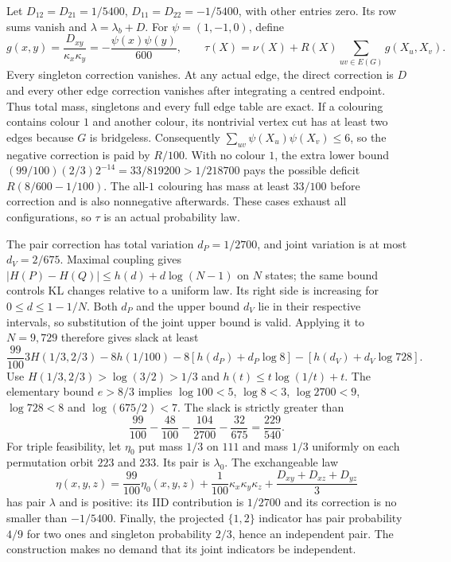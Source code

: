 \documentclass[a4paper,11pt,reqno]{amsart}
\theoremstyle{plain}
\theoremstyle{definition}
\theoremstyle{remark}
\begin{document}
Let $D_{12}=D_{21}=1/5400$, $D_{11}=D_{22}=-1/5400$, with other
entries zero.  Its row sums vanish and $\lambda=\lambda_b+D$.
For $\psi=(1,-1,0)$, define
\[
 g(x,y)=\frac{D_{xy}}{\kappa_x\kappa_y}
       =-\frac{\psi(x)\psi(y)}{600},\qquad
 \tau(X)=\nu(X)+R(X)\sum_{uv\in E(G)}g(X_u,X_v).
\]
Every singleton correction vanishes.  At any actual edge, the direct
correction is $D$ and every other edge correction vanishes after integrating
a centred endpoint.  Thus total mass, singletons and every full edge table
are exact.  If a colouring contains colour $1$ and another colour, its
nontrivial vertex cut has at least two edges because $G$ is bridgeless.
Consequently $\sum_{uv}\psi(X_u)\psi(X_v)\le6$, so the negative
correction is paid by $R/100$.  With no colour $1$, the extra lower bound
$(99/100)(2/3)2^{-14}=33/819200>1/218700$ pays the possible deficit
$R(8/600-1/100)$.  The all-$1$ colouring has mass at least $33/100$
before correction and is also nonnegative afterwards.  These cases exhaust
all configurations, so $\tau$ is an actual probability law.

The pair correction has total variation $d_P=1/2700$, and joint variation
is at most $d_V=2/675$.  Maximal coupling gives
$|H(P)-H(Q)|\le h(d)+d\log(N-1)$ on $N$ states; the same bound
controls KL changes relative to a uniform law.  Its right side is increasing
for $0\le d\le1-1/N$.  Both $d_P$ and the upper bound $d_V$ lie in
their respective intervals, so substitution of the joint upper bound is valid.
Applying it to $N=9,729$
therefore gives slack at least
\[
 \frac{99}{100}3H(1/3,2/3)-8h(1/100)
 -8[h(d_P)+d_P\log8]-[h(d_V)+d_V\log728].
\]
Use $H(1/3,2/3)>\log(3/2)>1/3$ and
$h(t)\le t\log(1/t)+t$.  The elementary bound $e>8/3$ implies
$\log100<5$, $\log8<3$, $\log2700<9$, $\log728<8$ and
$\log(675/2)<7$.  The slack is strictly greater than
\[
 \frac{99}{100}-\frac{48}{100}-\frac{104}{2700}-\frac{32}{675}
 =\frac{229}{540}.
\]
For triple feasibility, let $\eta_0$ put mass $1/3$ on $111$ and mass
$1/3$ uniformly on each permutation orbit $223$ and $233$.
Its pair is $\lambda_0$.  The exchangeable law
\[
 \eta(x,y,z)=\frac{99}{100}\eta_0(x,y,z)
       +\frac1{100}\kappa_x\kappa_y\kappa_z
       +\frac{D_{xy}+D_{xz}+D_{yz}}3
\]
has pair $\lambda$ and is positive: its IID contribution is $1/2700$
and its correction is no smaller than $-1/5400$.
Finally, the projected $\{1,2\}$ indicator has pair probability $4/9$
for two ones and singleton probability $2/3$, hence an independent pair.
The construction makes no demand that its joint indicators be independent.
\end{document}
